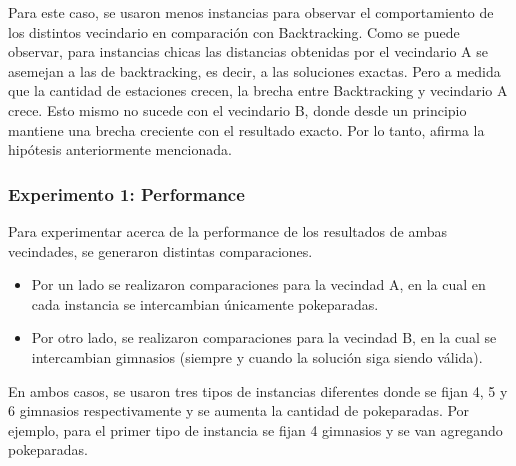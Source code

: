 Para este caso, se usaron menos instancias para observar el comportamiento de los distintos vecindario en comparación con Backtracking.  Como se puede observar, para instancias chicas las distancias obtenidas por el vecindario A se asemejan a las de backtracking, es decir, a las soluciones exactas. Pero a medida que la cantidad de estaciones crecen, la brecha entre Backtracking y vecindario A crece. Esto mismo no sucede con el vecindario B, donde desde un principio mantiene una brecha creciente con el resultado exacto. Por lo tanto, afirma la hipótesis anteriormente mencionada.

\subsubsection{Experimento 1: Performance} 
            Para experimentar acerca de la performance de los resultados de ambas vecindades, se generaron distintas comparaciones. 

            \begin{itemize}
                \item Por un lado se realizaron comparaciones para la vecindad A, en la cual en cada instancia se intercambian únicamente pokeparadas.
 
                \item Por otro lado, se realizaron comparaciones para la vecindad B, en la cual se intercambian gimnasios (siempre y cuando la solución siga siendo válida).
            \end{itemize}
			
			En ambos casos, se usaron tres tipos de instancias diferentes donde se fijan 4, 5 y 6 gimnasios respectivamente y se aumenta la cantidad de pokeparadas. Por ejemplo, para el primer tipo de instancia se fijan 4 gimnasios y se van agregando pokeparadas.

\blindtext


